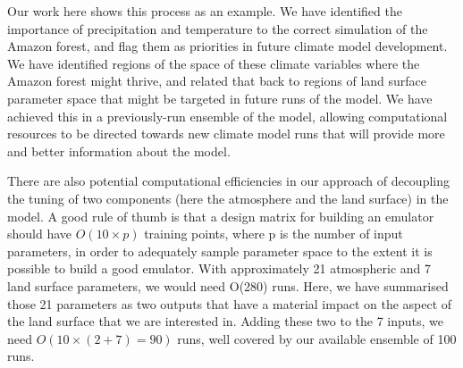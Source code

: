 \documentclass[gmd, manuscript]{copernicus}
\begin{document}
Our work here shows this process as an example. We have identified the importance of precipitation and temperature to the correct simulation of the Amazon forest, and flag them as priorities in future climate model development. We have identified regions of the space of these climate variables where the Amazon forest might thrive, and related that back to regions of land surface parameter space that might be targeted in future runs of the model. We have achieved this in a previously-run ensemble of the model, allowing computational resources to be directed towards new climate model runs that will provide more and better information about the model.

There are also potential computational efficiencies in our approach of decoupling the tuning of two components (here the atmosphere and the land surface) in the model. A good rule of thumb is that a design matrix for building an emulator should have $O(10 \times p)$ training points, where p is the number of input parameters, in order to adequately sample parameter space to the extent it is possible to build a good emulator. With approximately 21 atmospheric and 7 land surface parameters, we would need O(280) runs. Here, we have summarised those 21 parameters as two outputs that have a material impact on the aspect of the land surface that we are interested in. Adding these two to the 7 inputs, we need $O(10 \times (2+7) = 90)$ runs, well covered by our available ensemble of 100 runs. 
\end{document}
